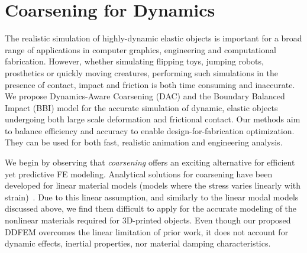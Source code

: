 \section{Coarsening for Dynamics}
The realistic simulation of highly-dynamic elastic objects is important for a broad range of applications in computer graphics, engineering and computational fabrication.
However, whether simulating flipping toys, jumping robots, prosthetics or quickly moving creatures, performing such simulations in the presence of contact, impact and friction is both time consuming and inaccurate.
We propose Dynamics-Aware Coarsening (DAC) and the Boundary Balanced Impact (BBI) model for the accurate simulation of dynamic, elastic objects undergoing both large scale deformation and frictional contact.
Our methods aim to balance efficiency and accuracy to enable design-for-fabrication optimization. They can be used for both fast, realistic animation and engineering analysis. 

We begin by observing that \emph{coarsening} offers an exciting alternative for efficient yet predictive FE modeling.
Analytical solutions for coarsening have been developed for linear material models (models where the stress varies linearly with strain)~\cite{Kharevych2009,Nesme2009,Torres:2016:HIC}.
Due to this linear assumption, and similarly to the linear modal models discussed above, we find them difficult to apply for the accurate modeling of the nonlinear materials required for 3D-printed objects.
Even though our proposed DDFEM overcomes the linear limitation of prior work, it does not account for dynamic effects, inertial properties, nor material damping characteristics.

